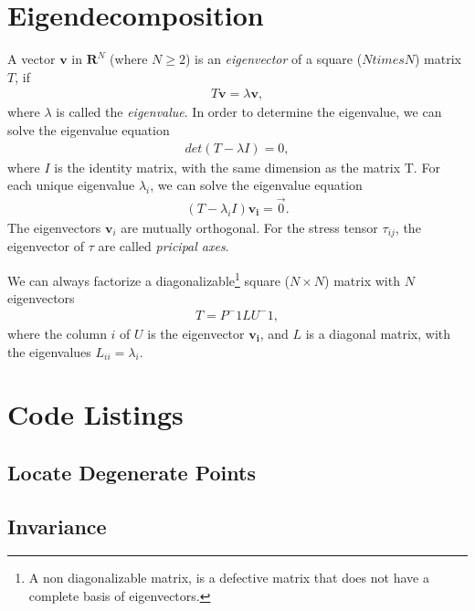 \documentclass[main.tex]{subfiles}
\begin{document}
\section{Eigendecomposition}
\label{sec:eigdecomp}
A vector $\mathbf{v}$ in $\mathbf{R}^N$ (where $N \geq 2$)
is an \emph{eigenvector} of a square ($Ntimes N$) matrix  $T$, if
\begin{align*}
T\mathbf{v} = \lambda \mathbf{v},
\end{align*}
where $\lambda$ is called the \emph{eigenvalue}. In order to determine the eigenvalue,
we can solve the eigenvalue equation
\begin{align*}
det(T - \lambda I) = 0,
\end{align*}
where $I$ is the identity matrix, with the same dimension as the matrix T. For each
unique eigenvalue $\lambda_i$, we can solve the eigenvalue equation
\begin{align*}
(T - \lambda_i I)\mathbf{v_i} = \vec{0}.
\end{align*}
The eigenvectors $\mathbf{v}_i$ are mutually orthogonal. For the stress tensor $\tau_{ij}$,
the eigenvector of $\tau$ are called \emph{pricipal axes}.

We can always factorize a diagonalizable\footnote{A non diagonalizable matrix, is a defective 
matrix that does not have a complete basis of eigenvectors.} square ($N\times N$) matrix with $N$ 
eigenvectors
\begin{align*}
T = P^-1LU^-1,
\end{align*}
where the column $i$ of $U$ is the eigenvector $\mathbf{v_i}$, and $L$ is a diagonal
matrix, with the eigenvalues $L_{ii} = \lambda_i$.

\section{Code Listings}
\label{sec:codelistings}

\subsection{Locate Degenerate Points}
\label{appendix:degeneracies}
\lstset{style=Python}


\subsection{Invariance}
\label{appendix:invariance}
\lstset{style=Python}

\end{document}

